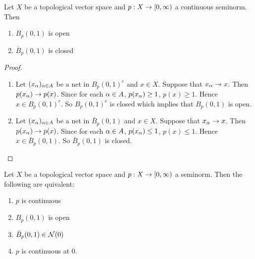 \documentclass{book}
\begin{document}
	\begin{ex}
		Let $X$ be a topological vector space and $p:X \rightarrow [0,\infty)$ a continuous seminorm. Then 
		\begin{enumerate}
			\item $B_p(0,1)$ is open 
			\item $\bar{B}_p(0,1)$ is closed
		\end{enumerate}
	\end{ex}

	\begin{proof}\
		\begin{enumerate}
			\item Let $(x_{\alpha})_{\alpha \in A}$ be a net in $B_p(0,1)^c$ and $x \in X$. Suppose that $x_{\alpha} \rightarrow x$. Then $p(x_{\alpha}) \rightarrow p(x)$. Since for each $\alpha \in A$, $p(x_{\alpha}) \geq 1$, $p(x) \geq 1$. Hence $x \in B_p(0,1)^c$. So $B_p(0,1)^c$ is closed which implies that $B_p(0,1)$ is open.
			\item Let $(x_{\alpha})_{\alpha \in A}$ be a net in $\bar{B}_p(0,1)$ and $x \in X$. Suppose that $x_{\alpha} \rightarrow x$. Then $p(x_{\alpha}) \rightarrow p(x)$. Since for each $\alpha \in A$, $p(x_{\alpha}) \leq 1$, $p(x) \leq 1$. Hence $x \in \bar{B}_p(0,1)$. So $\bar{B}_p(0,1)$ is closed.
		\end{enumerate}
	\end{proof}

	\begin{ex}
		Let $X$ be a topological vector space and $p:X \rightarrow [0,\infty)$ a seminorm. Then the following are quivalent:
		\begin{enumerate}
			\item $p$ is continuous
			\item $B_p(0,1)$ is open
			\item $\bar{B}_p(0,1) \in \mathcal{N}(0)$ 
			\item $p$ is continuous at $0$. 
		\end{enumerate}
	\end{ex}
\end{document}
